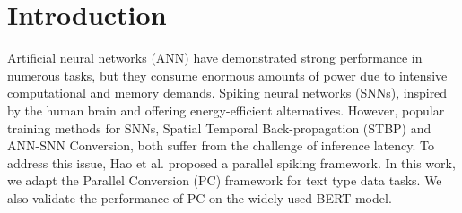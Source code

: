 \section{Introduction}
Artificial neural networks (ANN) have demonstrated strong performance in numerous tasks, but they consume enormous amounts of power due to intensive computational and memory demands. Spiking neural networks (SNNs), inspired by the human brain and offering energy-efficient alternatives. However, popular training methods for SNNs, Spatial Temporal Back-propagation (STBP) and ANN-SNN Conversion, both suffer from the challenge of inference latency. To address this issue, Hao et al. \cite{hao2024faster} proposed a parallel spiking framework. In this work, we adapt the Parallel Conversion (PC) framework for text type data tasks. We also validate the performance of PC on the widely used BERT model.